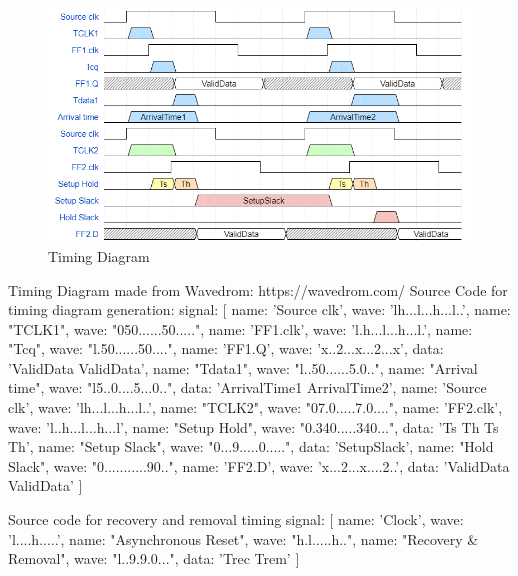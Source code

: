 \begin{figure}[H]
\begin{center}
\includegraphics[width=\textwidth]{images/TimingDiaFF.png}
\caption{Timing Diagram}
\label{TimingDiaFF}
\end{center}
\end{figure}
    

\iffalse
Timing Diagram made from Wavedrom: https://wavedrom.com/
Source Code for timing diagram generation:
{signal: [
  {name: 'Source clk', wave: 'lh...l...h...l..'},
  {name: "TCLK1",   wave: "050......50....."},
  {name: 'FF1.clk', wave: 'l.h...l...h...l.'},
  {name: "Tcq",   wave: "l.50......50...."},
  {name: 'FF1.Q', wave: 'x..2...x...2...x', data: 'ValidData ValidData'},
  {name: "Tdata1",   wave: "l..50......5.0.."},
  {name: "Arrival time",   wave: "l5..0....5...0..", data: 'ArrivalTime1 ArrivalTime2'},
  {name: 'Source clk', wave: 'lh...l...h...l..'},  
  {name: "TCLK2",   wave: "07.0.....7.0...."},
  {name: 'FF2.clk', wave: 'l..h...l...h...l'},  
  {name: "Setup Hold",   wave: "0.340.....340...", data: 'Ts Th Ts Th'},  
  {name: "Setup Slack",   wave: "0...9.....0.....", data: 'SetupSlack'},  
  {name: "Hold Slack",   wave: "0...........90.."}, 
  {name: 'FF2.D', wave: 'x...2...x....2..',  data: 'ValidData ValidData'}
]}

Source code for recovery and removal timing
{signal: [
  {name: 'Clock', wave: 'l....h.....'},
  {name: "Asynchronous Reset",   wave: "h.l.....h.."},
  {name: "Recovery & Removal",   wave: "l..9.9.0...", data: 'Trec Trem'}
]}

